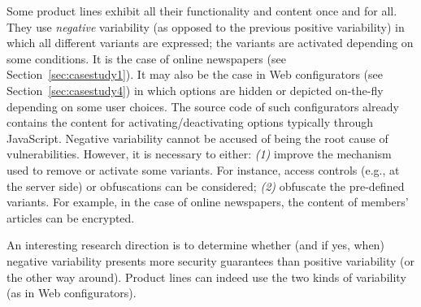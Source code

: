 



 Some product lines exhibit all their functionality and content once and for all. They use \emph{negative} variability (as opposed to the previous positive variability) in which all different variants are expressed; the variants are activated depending on some conditions. 
It is the case of online newspapers (see Section~\ref{sec:casestudy1}). 
 It may also be the case in Web configurators (see Section~\ref{sec:casestudy4}) in which options are hidden or depicted on-the-fly depending on some user choices. The source code of such configurators already contains the content for activating/deactivating options typically through JavaScript. 
 Negative variability cannot be accused of being the root cause of vulnerabilities. However, it is necessary to either:
\emph{(1)} improve the mechanism used to remove or activate some variants. For instance, access controls (e.g., at the server side) or obfuscations can be considered; \emph{(2)} obfuscate the pre-defined variants. For example, in the case of online newspapers, the content of members' articles can be encrypted.


An interesting research direction is to determine whether (and if yes, when) negative variability presents more security guarantees than positive variability (or the other way around). Product lines can indeed use the two kinds of variability (\eg as in Web configurators). 


